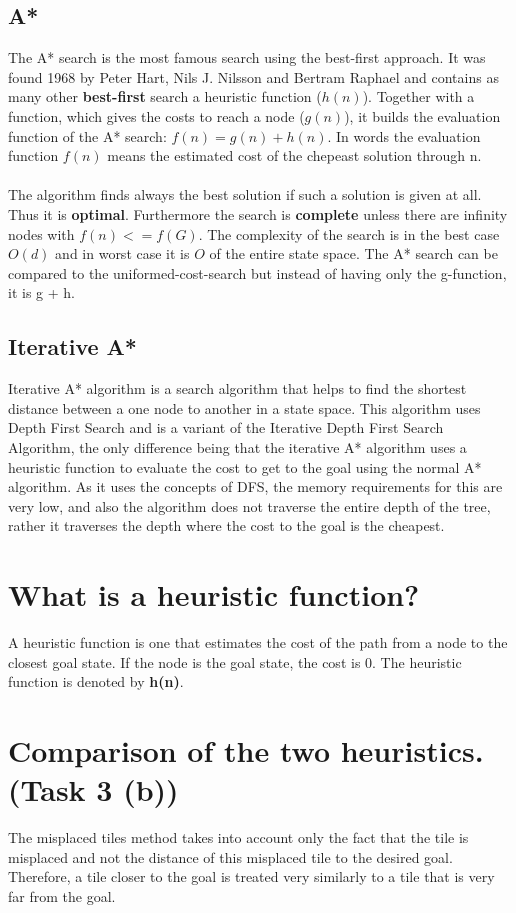 \documentclass[11pt]{article}
\begin{document}
\subsection{A*}
The A* search is the most famous search using the best-first approach. It was found 1968 by Peter Hart, Nils J. Nilsson and Bertram Raphael and contains as many other \textbf{best-first} search a heuristic function ($h(n)$). Together with a function, which gives the costs to reach a node ($g(n)$), it builds the evaluation function of the A* search: $f(n) = g(n) + h(n)$. In words the evaluation function $f(n)$ means the estimated cost of the chepeast solution through n.\\
\\
The algorithm finds always the best solution if such a  solution is given at all. Thus it is \textbf{optimal}. Furthermore the search is \textbf{complete} unless there are infinity nodes with $f(n) <= f(G)$. The complexity of the search is in the best case $O(d)$ and in worst case it is $O$ of the entire state space. The A* search can be compared to the uniformed-cost-search but instead of having only the g-function, it is g + h.

\subsection{Iterative A*}
Iterative A* algorithm is a search algorithm that helps to find the shortest distance between a one node to another in a state space. This algorithm uses Depth First Search and is a variant of the Iterative Depth First Search Algorithm, the only difference being that the iterative A* algorithm uses a heuristic function to evaluate the cost to get to the goal using the normal A* algorithm. As it uses the concepts of DFS, the memory requirements for this are very low, and also the algorithm does not traverse the entire depth of the tree, rather it traverses the depth where the cost to the goal is the cheapest.

\newpage
\section{What is a heuristic function?}
A heuristic function is one that estimates the cost of the path from a node to the closest goal state. If the node is the goal state, the cost is 0. The heuristic function is denoted by \textbf{h(n)}.

\newpage
\section{Comparison of the two heuristics. (Task 3 (b))}
The misplaced tiles method takes into account only the fact that the tile is misplaced and not the distance of this misplaced tile to the desired goal. Therefore, a tile closer to the goal is treated very similarly to a tile that is very far from the goal.
\end{document}
